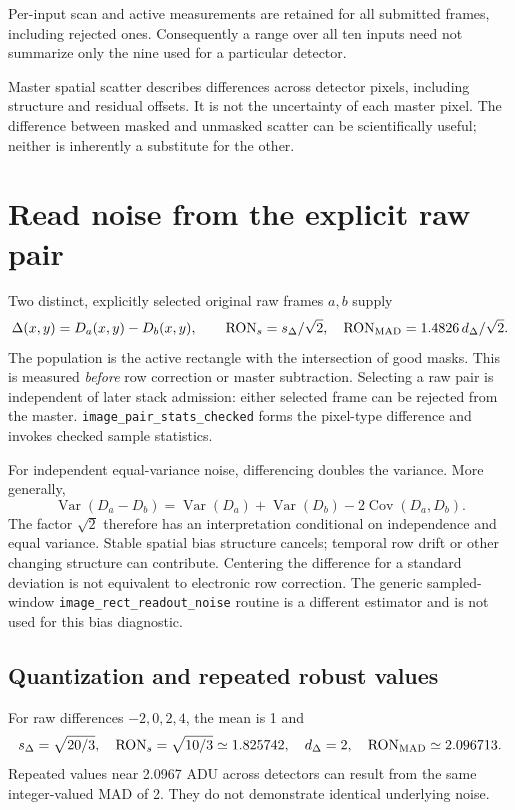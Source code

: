\documentclass[11pt,a4paper]{article}
\newcommand{\code}[1]{\nolinkurl{#1}}
\newcommand{\Var}{\operatorname{Var}}\newcommand{\Cov}{\operatorname{Cov}}
\begin{document}
Per-input scan and active measurements are retained for all submitted frames,
including rejected ones. Consequently a range over all ten inputs need not
summarize only the nine used for a particular detector.

Master spatial scatter describes differences across detector pixels, including
structure and residual offsets. It is not the uncertainty of each master
pixel. The difference between masked and unmasked scatter can be scientifically
useful; neither is inherently a substitute for the other.

\newpage
\section{Read noise from the explicit raw pair}
Two distinct, explicitly selected original raw frames $a,b$ supply
\[
 \Delta(x,y)=D_a(x,y)-D_b(x,y),\qquad
 \operatorname{RON}_{s}=s_\Delta/\sqrt2,\quad
 \operatorname{RON}_{\rm MAD}=1.4826\,d_\Delta/\sqrt2.
\]
The population is the active rectangle with the intersection of good masks.
This is measured \emph{before} row correction or master subtraction. Selecting
a raw pair is independent of later stack admission: either selected frame can
be rejected from the master. \code{image_pair_stats_checked} forms the pixel-type
difference and invokes checked sample statistics.

For independent equal-variance noise, differencing doubles the variance.
More generally,
\[
 \Var(D_a-D_b)=\Var(D_a)+\Var(D_b)-2\Cov(D_a,D_b).
\]
The factor $\sqrt2$ therefore has an interpretation conditional on independence
and equal variance. Stable spatial bias structure cancels; temporal row drift
or other changing structure can contribute. Centering the difference for a
standard deviation is not equivalent to electronic row correction.
The generic sampled-window \code{image_rect_readout_noise} routine is a
different estimator and is not used for this bias diagnostic.

\subsection*{Quantization and repeated robust values}
For raw differences $-2,0,2,4$, the mean is 1 and
\[
 s_\Delta=\sqrt{20/3},\quad \operatorname{RON}_s=\sqrt{10/3}
 \simeq1.825742,\quad
 d_\Delta=2,\quad\operatorname{RON}_{\rm MAD}\simeq2.096713.
\]
Repeated values near 2.0967 ADU across detectors can result from the same
integer-valued MAD of 2. They do not demonstrate identical underlying noise.
\end{document}

